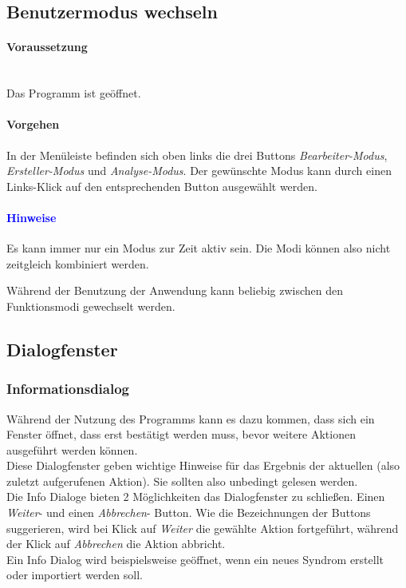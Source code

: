 \documentclass[enabledeprecatedfontcommands,fontsize=11pt,paper=a4,twoside]{scrartcl}
\newcommand*{\bbe}{\textcolor{bbe}}
\newcounter{one}
\newcounter{two}[one]
\newcommand*{\hint}{\paragraph{\textcolor{blue}{Hinweise}}}
\newcommand*{\condition}{\paragraph{Voraussetzung}$\;$ \vspace{0.2cm}\\}
\newcommand*{\action}{\paragraph{Vorgehen}}
\let\tempone\itemize
\let\temptwo\enditemize
\renewenvironment{itemize}{\tempone\addtolength{\itemsep}{-10.0pt}}{\temptwo}
\let\origenumerate\enumerate
\let\origendenumerate\endenumerate
\renewenvironment{enumerate}{\origenumerate \addtolength{\itemsep}{-10.0pt}}{\origendenumerate}
\begin{document}
\subsection{Benutzermodus wechseln}
	\condition 
		Das Programm ist geöffnet.
	\action
	\begin{enumerate}
		\item In der Menüleiste befinden sich oben links die drei Buttons \textit{Bearbeiter-Modus}, \textit{Ersteller-Modus} und \textit{Analyse-Modus}. Der gewünschte Modus kann durch einen Links-Klick auf den entsprechenden Button ausgewählt werden.
	\end{enumerate} 
	\hint
	\begin{itemize}
		\item Es kann immer nur ein Modus zur Zeit aktiv sein. Die Modi können also nicht zeitgleich kombiniert werden.
		\item Während der Benutzung der Anwendung kann beliebig zwischen den Funktionsmodi gewechselt werden. \\
\end{itemize}			 
		
\newpage
\subsection{Dialogfenster} \label{dialog}
\subsubsection{Informationsdialog}
Während der Nutzung des Programms kann es dazu kommen, dass sich ein Fenster öffnet, dass erst bestätigt werden muss, bevor weitere Aktionen ausgeführt werden können. \\
Diese Dialogfenster geben wichtige Hinweise für das Ergebnis der aktuellen (also zuletzt aufgerufenen Aktion). \bbe{Sie sollten also unbedingt gelesen werden.} \\
Die Info Dialoge bieten 2 Möglichkeiten das Dialogfenster zu schließen. Einen \textit{Weiter}- und einen \textit{Abbrechen}- Button. Wie die Bezeichnungen der Buttons suggerieren, wird bei Klick auf \textit{Weiter} die gewählte Aktion fortgeführt, während der Klick auf \textit{Abbrechen} die Aktion abbricht. \\
Ein Info Dialog wird beispielsweise geöffnet, wenn ein neues Syndrom erstellt oder importiert werden soll. \\
\end{document}
